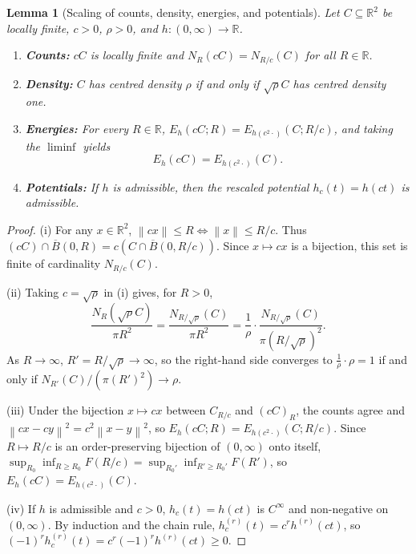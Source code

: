 \documentclass[11pt, a4paper]{article}
\newtheorem{lemma}[theorem]{Lemma}
\theoremstyle{definition}
\theoremstyle{remark}
\newcommand{\R}{\mathbb{R}}
\newcommand{\Bbar}{\overline{B}}
\newcommand{\norm}[1]{\left\lVert #1 \right\rVert}
\begin{document}
\begin{lemma}[Scaling of counts, density, energies, and potentials]
\label{lem:scaling}
Let $C \subseteq \R^2$ be locally finite, $c > 0$, $\rho > 0$, and $h : (0, \infty) \to \R$.
\begin{enumerate}[label=(\roman*)]
    \item \textbf{Counts:} $c C$ is locally finite and $N_R(c C) = N_{R/c}(C)$ for all $R \in \R$.
    \item \textbf{Density:} $C$ has centred density $\rho$ if and only if $\sqrt{\rho} C$ has centred density one.
    \item \textbf{Energies:} For every $R \in \R$, $E_h(c C; R) = E_{h(c^2 \cdot)}(C; R/c)$, and taking the $\liminf$ yields
    \[
    E_h(c C) = E_{h(c^2 \cdot)}(C).
    \]
    \item \textbf{Potentials:} If $h$ is admissible, then the rescaled potential $h_c(t) = h(c t)$ is admissible.
\end{enumerate}
\end{lemma}

\begin{proof}
(i) For any $x \in \R^2$, $\norm{c x} \le R \iff \norm{x} \le R/c$. Thus $(c C) \cap \Bbar(0, R) = c \left(C \cap \Bbar(0, R/c)\right)$. Since $x \mapsto c x$ is a bijection, this set is finite of cardinality $N_{R/c}(C)$.

\noindent (ii) Taking $c = \sqrt{\rho}$ in (i) gives, for $R > 0$,
\[
\frac{N_R(\sqrt{\rho} C)}{\pi R^2} = \frac{N_{R/\sqrt{\rho}}(C)}{\pi R^2} = \frac{1}{\rho} \cdot \frac{N_{R/\sqrt{\rho}}(C)}{\pi (R/\sqrt{\rho})^2}.
\]
As $R \to \infty$, $R' = R/\sqrt{\rho} \to \infty$, so the right-hand side converges to $\frac{1}{\rho} \cdot \rho = 1$ if and only if $N_{R'}(C)/(\pi (R')^2) \to \rho$.

\noindent (iii) Under the bijection $x \mapsto c x$ between $C_{R/c}$ and $(c C)_R$, the counts agree and $\norm{c x - c y}^2 = c^2 \norm{x - y}^2$, so $E_h(c C; R) = E_{h(c^2 \cdot)}(C; R/c)$. Since $R \mapsto R/c$ is an order-preserving bijection of $(0, \infty)$ onto itself, $\sup_{R_0} \inf_{R \ge R_0} F(R/c) = \sup_{R_0'} \inf_{R' \ge R_0'} F(R')$, so $E_h(c C) = E_{h(c^2 \cdot)}(C)$.

\noindent (iv) If $h$ is admissible and $c > 0$, $h_c(t) = h(ct)$ is $C^\infty$ and non-negative on $(0, \infty)$. By induction and the chain rule, $h_c^{(r)}(t) = c^r h^{(r)}(ct)$, so $(-1)^r h_c^{(r)}(t) = c^r (-1)^r h^{(r)}(ct) \ge 0$.
\end{proof}
\end{document}

